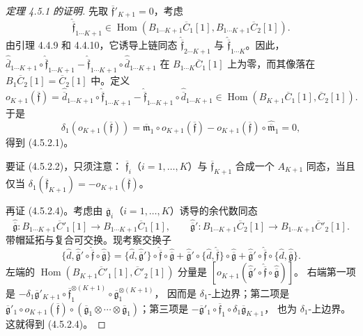 \begin{proof}[定理 4.5.1 的证明]
先取 $\overline{\mathfrak f}'_{K+1}=0$，考虑
\[
 \widehat{\overline{\mathfrak f}}_{1\cdots K+1}
 \in\operatorname{Hom}
 (B_{1\cdots K+1}\overline C_1[1],
  B_{1\cdots K+1}\overline C_2[1]).
\]
由引理 4.4.9 和 4.4.10，它诱导上链同态
$\widehat{\overline{\mathfrak f}}_{2\cdots K+1}$ 与
$\widehat{\overline{\mathfrak f}}_{1\cdots K}$。因此，
$\widehat{\overline d}_{1\cdots K+1}
\circ\widehat{\overline{\mathfrak f}}_{1\cdots K+1}
-\widehat{\overline{\mathfrak f}}_{1\cdots K+1}
\circ\widehat{\overline d}_{1\cdots K+1}$
在 $B_{1\cdots K}\overline C_1[1]$ 上为零，而其像落在
$B_1\overline C_2[1]=\overline C_2[1]$ 中。定义
\[
 o_{K+1}(\overline{\mathfrak f})
 =\widehat{\overline d}_{1\cdots K+1}
   \circ\widehat{\overline{\mathfrak f}}_{1\cdots K+1}
  -\widehat{\overline{\mathfrak f}}_{1\cdots K+1}
   \circ\widehat{\overline d}_{1\cdots K+1}
 \in\operatorname{Hom}
 (B_{K+1}\overline C_1[1],\overline C_2[1]).
\]
于是
\[
 \delta_1(o_{K+1}(\overline{\mathfrak f}))
 =\overline{\mathfrak m}_1\circ o_{K+1}(\overline{\mathfrak f})
 -o_{K+1}(\overline{\mathfrak f})
  \circ\widehat{\overline{\mathfrak m}}_1=0,
\]
得到 (4.5.2.1)。

要证 (4.5.2.2)，只须注意：
$\overline{\mathfrak f}_i$（$i=1,\ldots,K$）与
$\overline{\mathfrak f}_{K+1}$ 合成一个 $A_{K+1}$ 同态，当且仅当
$\delta_1(\overline{\mathfrak f}_{K+1})
=-o_{K+1}(\overline{\mathfrak f})$。

再证 (4.5.2.4)。考虑由
$\overline{\mathfrak g}_i$（$i=1,\ldots,K$）诱导的余代数同态
\[
 \widehat{\overline{\mathfrak g}}\colon
 B_{1\cdots K+1}\overline C'_1[1]\longrightarrow
 B_{1\cdots K+1}\overline C_1[1],
 \qquad
 \widehat{\overline{\mathfrak g}}'\colon
 B_{1\cdots K+1}\overline C_2[1]\longrightarrow
 B_{1\cdots K+1}\overline C'_2[1].
\]
带帽延拓与复合可交换。现考察交换子
\[
 \{\widehat d,\widehat{\overline{\mathfrak g}}'
    \circ\widehat{\overline{\mathfrak f}}
    \circ\widehat{\overline{\mathfrak g}}\}
 =\{\widehat d,\widehat{\overline{\mathfrak g}}'\}
    \circ\widehat{\overline{\mathfrak f}}
    \circ\widehat{\overline{\mathfrak g}}
 +\widehat{\overline{\mathfrak g}}'
    \circ\{\widehat d,\widehat{\overline{\mathfrak f}}\}
    \circ\widehat{\overline{\mathfrak g}}
 +\widehat{\overline{\mathfrak g}}'
    \circ\widehat{\overline{\mathfrak f}}
    \circ\{\widehat d,\widehat{\overline{\mathfrak g}}\}.
\]
左端的
$\operatorname{Hom}(B_{K+1}\overline C'_1[1],
\overline C'_2[1])$ 分量是
$[o_{K+1}(\widehat{\overline{\mathfrak g}}'
\circ\widehat{\overline{\mathfrak f}}
\circ\widehat{\overline{\mathfrak g}})]$。
右端第一项是
$-\delta_1\overline{\mathfrak g}'_{K+1}
\circ\overline{\mathfrak f}_1^{\otimes(K+1)}
\circ\overline{\mathfrak g}_1^{\otimes(K+1)}$，
因而是 $\delta_1$-上边界；第二项是
$\overline{\mathfrak g}'_1\circ
o_{K+1}(\overline{\mathfrak f})\circ
(\overline{\mathfrak g}_1\otimes\cdots
\otimes\overline{\mathfrak g}_1)$；第三项是
$-\overline{\mathfrak g}'_1\circ
\overline{\mathfrak f}_1\circ
\delta_1\overline{\mathfrak g}_{K+1}$，
也为 $\delta_1$-上边界。这就得到 (4.5.2.4)。


\end{proof}
